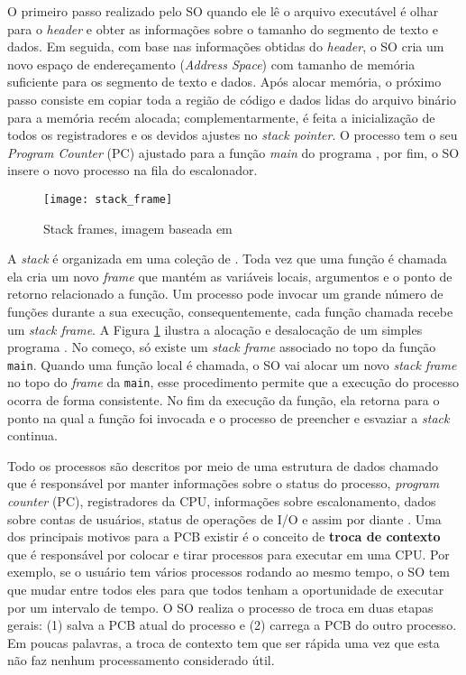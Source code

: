 O primeiro passo realizado pelo SO quando ele lê o arquivo executável é olhar
para o \emph{header} e obter as informações sobre o tamanho do segmento de
texto e dados. Em seguida, com base nas informações obtidas do \emph{header}, o
SO cria um novo espaço de endereçamento (\emph{Address Space}) com tamanho de
memória suficiente para os segmento de texto e dados. Após alocar memória, o
próximo passo consiste em copiar toda a região de código e dados lidas do
arquivo binário para a memória recém alocada; complementarmente, é feita a
inicialização de todos os registradores e os devidos ajustes no \emph{stack
pointer}. O processo tem o seu \emph{Program Counter} (PC) ajustado para a
função \emph{main} do programa \citep{patterson}, por fim, o SO insere o novo
processo na fila do escalonador.

\begin{figure}[!h]
  \centering
  \texttt{[image: stack\_frame]}
  \caption{Stack frames, imagem baseada em \cite{patterson}}
  \label{fig:stack_frames} 
\end{figure}


A \emph{stack} é organizada em uma coleção de . Toda vez
que uma função é chamada ela cria um novo \emph{frame} que mantém as variáveis
locais, argumentos e o ponto de retorno relacionado a função. Um processo pode
invocar um grande número de funções durante a sua execução, consequentemente,
cada função chamada recebe um \emph{stack frame}. A Figura
\ref{fig:stack_frames} ilustra a alocação e desalocação de um simples programa
\cite{gdb}. No começo, só existe um \emph{stack frame} associado no topo da
função \texttt{main}. Quando uma função local é chamada, o SO vai alocar um
novo \emph{stack frame} no topo do \emph{frame} da \texttt{main}, esse
procedimento permite que a execução do processo ocorra de forma consistente. No
fim da execução da função, ela retorna para o ponto na qual a função foi
invocada e o processo de preencher e esvaziar a \emph{stack} continua.

Todo os processos são descritos por meio de uma estrutura de dados chamado
 que é responsável por manter informações
sobre o status do processo, \emph{program counter} (PC), registradores da CPU,
informações sobre escalonamento, dados sobre contas de usuários, status de
operações de I/O e assim por diante \citep{silberschatz}. Uma dos principais
motivos para a PCB existir é o conceito de \textbf{troca de contexto} que é
responsável por colocar e tirar processos para executar em uma CPU. Por
exemplo, se o usuário tem vários processos rodando ao mesmo tempo, o SO tem que
mudar entre todos eles para que todos tenham a oportunidade de executar por um
intervalo de tempo. O SO realiza o processo de troca em duas etapas gerais: (1)
salva a PCB atual do processo e (2) carrega a PCB do outro processo. Em
poucas palavras, a troca de contexto tem que ser rápida uma vez que esta não
faz nenhum processamento considerado útil.


